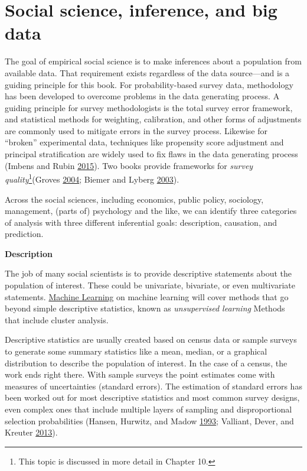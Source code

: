 \documentclass[]{krantz}
\begin{document}
\section{Social science, inference, and big data}\label{sec:1.3}

The goal of empirical social science is to make inferences about a
population from available data. That requirement exists regardless of
the data source---and is a guiding principle for this book. For
probability-based survey data, methodology has been developed to
overcome problems in the data generating process. A guiding principle
for survey methodologists is the total survey error framework, and
statistical methods for weighting, calibration, and other forms of
adjustments are commonly used to mitigate errors in the survey process.
Likewise for ``broken'' experimental data, techniques like propensity
score adjustment and principal stratification are widely used to fix
flaws in the data generating process (Imbens and Rubin
\protect\hyperlink{ref-imbens2015causal}{2015}). Two books provide
frameworks for \emph{survey quality}\footnote{This topic is discussed in
  more detail in Chapter 10.}(Groves
\protect\hyperlink{ref-groves2004survey}{2004}; Biemer and Lyberg
\protect\hyperlink{ref-biemer2003}{2003}).

Across the social sciences, including economics, public policy,
sociology, management, (parts of) psychology and the like, we can
identify three categories of analysis with three different inferential
goals: description, causation, and prediction.

\textbf{Description}

The job of many social scientists is to provide descriptive statements
about the population of interest. These could be univariate, bivariate,
or even multivariate statements. \protect\hyperlink{chap:ml}{Machine
Learning} on machine learning will cover methods that go beyond simple
descriptive statistics, known as \emph{unsupervised learning} Methods
that include cluster analysis.

Descriptive statistics are usually created based on census data or
sample surveys to generate some summary statistics like a mean, median,
or a graphical distribution to describe the population of interest. In
the case of a census, the work ends right there. With sample surveys the
point estimates come with measures of uncertainties (standard errors).
The estimation of standard errors has been worked out for most
descriptive statistics and most common survey designs, even complex ones
that include multiple layers of sampling and disproportional selection
probabilities (Hansen, Hurwitz, and Madow
\protect\hyperlink{ref-hansen1993sample}{1993}; Valliant, Dever, and
Kreuter \protect\hyperlink{ref-valliant2013practical}{2013}).
\end{document}
